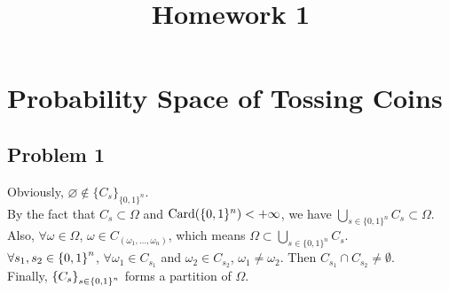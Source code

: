 \documentclass{article}
\begin{document}
\title{Homework 1}
\maketitle

\section{Probability Space of Tossing Coins}
\subsection*{\centering Problem 1}
Obviously, $\varnothing\notin\{C_s\}_{\{0,1\}^n}$.
\\
By the fact that $C_s\subset\Omega$ and  $\mbox{Card}\qty(\{0,1\}^n)<+\infty$, we have $\bigcup_{s\in\{0,1\}^n}C_s\subset\Omega$.
\\
Also, $\forall\omega\in\Omega$, $\omega\in C_{(\omega_1, \dots,\omega_n)}$, which means $\Omega\subset\bigcup_{s\in\{0,1\}^n}C_s$.
\\
$\forall s_1,s_2\in\qty{0,1}^n$, $\forall\omega_1\in C_{s_1}$ and $\omega_2\in C_{s_2}$, $\omega_1\ne \omega_2$. Then $C_{s_1}\cap C_{s_2}\ne \emptyset$.
\\
Finally, $\qty{C_s}_{s\in\qty{0,1}^n}$ forms a partition of  $\Omega$.
\end{document}

